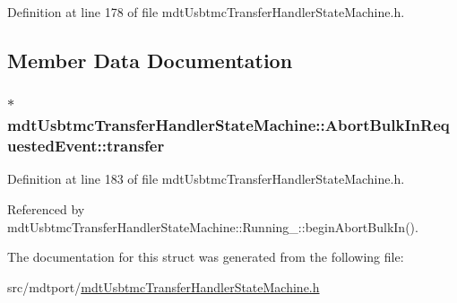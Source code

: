 Definition at line 178 of file mdt\-Usbtmc\-Transfer\-Handler\-State\-Machine.\-h.



\subsection{Member Data Documentation}
\hypertarget{structmdt_usbtmc_transfer_handler_state_machine_1_1_abort_bulk_in_requested_event_adb600c26b106f1a92bc5a9c7884d6fe1}{
\subsubsection[{transfer}]{$\ast$ mdt\-Usbtmc\-Transfer\-Handler\-State\-Machine\-::\-Abort\-Bulk\-In\-Requested\-Event\-::transfer}}\label{structmdt_usbtmc_transfer_handler_state_machine_1_1_abort_bulk_in_requested_event_adb600c26b106f1a92bc5a9c7884d6fe1}


Definition at line 183 of file mdt\-Usbtmc\-Transfer\-Handler\-State\-Machine.\-h.



Referenced by mdt\-Usbtmc\-Transfer\-Handler\-State\-Machine\-::\-Running\-\_\-\-::begin\-Abort\-Bulk\-In().



The documentation for this struct was generated from the following file\-:\begin{DoxyCompactItemize}
\item 
src/mdtport/\hyperlink{mdt_usbtmc_transfer_handler_state_machine_8h}{mdt\-Usbtmc\-Transfer\-Handler\-State\-Machine.\-h}\end{DoxyCompactItemize}
